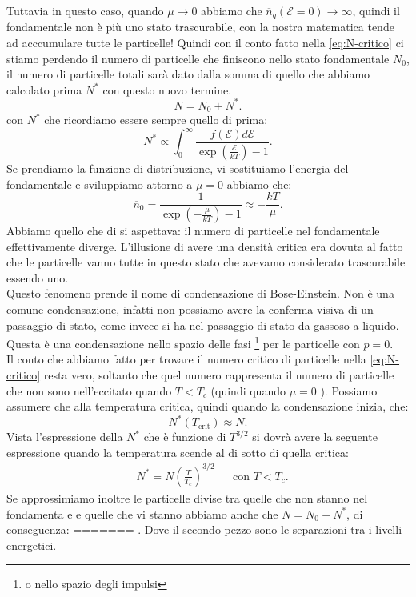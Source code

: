 Tuttavia in questo caso, quando $\mu \to 0$ abbiamo che $\overline{n}_{q}( \mathcal{E} = 0)  \to \infty$, quindi il fondamentale non è più uno stato trascurabile, con la nostra matematica tende ad acccumulare tutte le particelle!
Quindi con il conto fatto nella \ref{eq:N-critico} ci stiamo perdendo il numero di particelle che finiscono nello stato fondamentale $N_0$, il numero di particelle totali sarà dato dalla somma di quello che abbiamo calcolato prima $N^{*}$ con questo nuovo termine.
\[
	N = N_0 + N^{*}
.\] 
con $N^{*}$ che ricordiamo essere sempre quello di prima:
\[
	N^{*} \propto \int_{0}^{\infty} 
	\frac{f( \mathcal{E} ) d\mathcal{E} }
	{\exp\left( \frac{\mathcal{E} }{kT} \right) -1} 
.\] 
Se prendiamo la funzione di distribuzione, vi sostituiamo l'energia del fondamentale e sviluppiamo attorno a $\mu = 0$ abbiamo che:
\[
	\overline{n}_{0} = \frac{1}
		{\exp\left( -\frac{\mu }{kT} \right) -1 } \approx - \frac{kT}{\mu }
.\] 
Abbiamo quello che di si aspettava: il numero di particelle nel fondamentale effettivamente diverge. L'illusione di avere una densità critica era dovuta al fatto che le particelle vanno tutte in questo stato che avevamo considerato trascurabile essendo uno. \\ 
Questo fenomeno prende il nome di condensazione di Bose-Einstein. 
Non è una comune condensazione, infatti non possiamo avere la conferma visiva di un passaggio di stato, come invece si ha nel passaggio di stato da gassoso a liquido. 
Questa è una condensazione nello spazio delle fasi \footnote{o nello spazio degli impulsi} per le particelle con $p =0$. \\
Il conto che abbiamo fatto per trovare il numero critico di particelle nella \ref{eq:N-critico} resta vero, soltanto che quel numero rappresenta il numero di particelle che non sono nell'eccitato quando $T< T_{c}$ (quindi quando $\mu = 0$ ). Possiamo assumere che alla temperatura critica, quindi quando la condensazione inizia, che:
\[
	N^{*}( T_{\text{crit}})  \approx N
.\] 
Vista l'espressione della $N^{*}$ che è funzione di $T^{3 /2}$ si dovrà avere la seguente espressione quando la temperatura scende al di sotto di quella critica:
\begin{align}
	&N^{*} = N \left( \frac{T}{T_{c}} \right)^{3 /2}& & \text{con } T<T_{c}
.\end{align}
Se approssimiamo inoltre le particelle divise tra quelle che non stanno nel fondamenta e e quelle che vi stanno abbiamo anche che $N = N_0 + N^{*}$, di conseguenza:
=======
.\] Dove il secondo pezzo sono le separazioni tra i livelli energetici.
